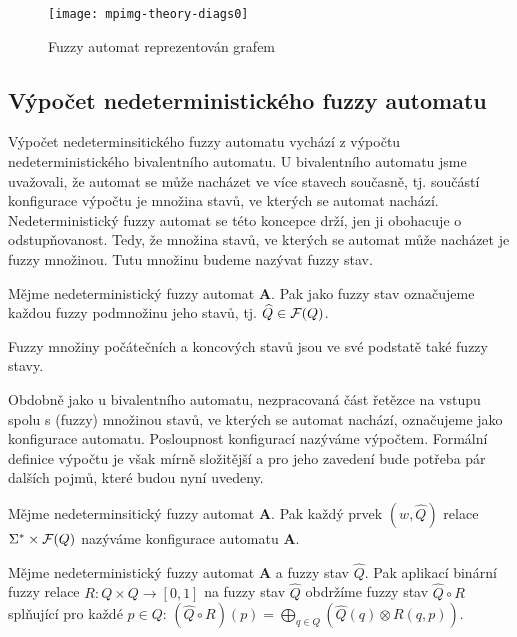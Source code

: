 \documentclass[a4paper,10pt]{article}
\begin{document}
\begin{figure}
 \centering
 
 \texttt{[image: mpimg-theory-diags0]}
 
 \caption{Fuzzy automat reprezentován grafem} \label{img:FuzAutDiag}
\end{figure}
  

\subsection{Výpočet nedeterministického fuzzy automatu}
Výpočet nedeterminsitického fuzzy automatu vychází z výpočtu nedeterministického bivalentního automatu. U bivalentního automatu jsme uvažovali, že automat se může nacházet ve více stavech současně, tj. součástí konfigurace výpočtu je množina stavů, ve kterých se automat nachází. Nedeterministický fuzzy automat se této koncepce drží, jen ji obohacuje o odstupňovanost. Tedy, že množina stavů, ve kterých se automat může nacházet je fuzzy množinou. Tutu množinu budeme nazývat fuzzy stav.

\begin{definition}\label{def-FuzzStav}
 Mějme nedeterministický fuzzy automat $\mathbf{A}$. Pak jako fuzzy stav označujeme každou fuzzy podmnožinu jeho stavů, tj. $\widehat{Q} \in \mathcal{F}(Q)$.
\end{definition}

\begin{note}
 Fuzzy množiny počátečních a koncových stavů jsou ve své podstatě také fuzzy stavy.
\end{note}

Obdobně jako u bivalentního automatu, nezpracovaná část řetězce na vstupu spolu s (fuzzy) množinou stavů, ve kterých se automat nachází, označujeme jako konfigurace automatu. Posloupnost konfigurací nazýváme výpočtem. Formální definice výpočtu je však mírně složitější a pro jeho zavedení bude potřeba pár dalších pojmů, které budou nyní uvedeny.

\begin{definition}
  Mějme nedeterminsitický fuzzy automat $\mathbf{A}$. Pak každý prvek $(w, \widehat{Q})$ relace $\Sigma^* \times \mathcal{F}(Q)$ nazýváme konfigurace automatu $\mathbf{A}$.
\end{definition}


\begin{definition}
 Mějme nedeterministický fuzzy automat $\mathbf{A}$ a fuzzy stav $\widehat{Q}$. Pak aplikací binární fuzzy relace $R: Q \times Q \rightarrow [0, 1]$ na fuzzy stav $\widehat{Q}$ obdržíme fuzzy stav $\widehat{Q} \circ R$ splňující pro každé $p \in Q$: $(\widehat{Q} \circ R )(p) = \bigoplus_{q \in Q} (\widehat{Q}(q) \otimes R(q, p))$.
\end{definition}
\end{document}
